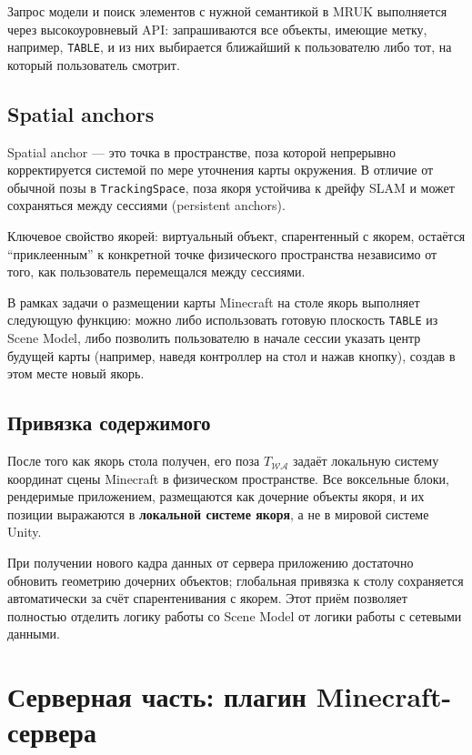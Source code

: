 \documentclass[a4paper,12pt]{article}
\begin{document}
Запрос модели и поиск элементов с нужной семантикой в MRUK выполняется через высокоуровневый API: запрашиваются все объекты, имеющие метку, например, \texttt{TABLE}, и из них выбирается ближайший к пользователю либо тот, на который пользователь смотрит.

\subsection*{Spatial anchors}

Spatial anchor --- это точка в пространстве, поза которой непрерывно корректируется системой по мере уточнения карты окружения. В отличие от обычной позы в \texttt{TrackingSpace}, поза якоря устойчива к дрейфу SLAM и может сохраняться между сессиями (persistent anchors).

Ключевое свойство якорей: виртуальный объект, спарентенный с якорем, остаётся ``приклеенным'' к конкретной точке физического пространства независимо от того, как пользователь перемещался между сессиями.

В рамках задачи о размещении карты Minecraft на столе якорь выполняет следующую функцию: можно либо использовать готовую плоскость \texttt{TABLE} из Scene Model, либо позволить пользователю в начале сессии указать центр будущей карты (например, наведя контроллер на стол и нажав кнопку), создав в этом месте новый якорь.

\subsection*{Привязка содержимого}

После того как якорь стола получен, его поза $T_{\mathcal{W}\mathcal{A}}$ задаёт локальную систему координат сцены Minecraft в физическом пространстве. Все воксельные блоки, рендеримые приложением, размещаются как дочерние объекты якоря, и их позиции выражаются в \textbf{локальной системе якоря}, а не в мировой системе Unity.

При получении нового кадра данных от сервера приложению достаточно обновить геометрию дочерних объектов; глобальная привязка к столу сохраняется автоматически за счёт спарентенивания с якорем. Этот приём позволяет полностью отделить логику работы со Scene Model от логики работы с сетевыми данными.



\section*{Серверная часть: плагин Minecraft-сервера}
\end{document}
